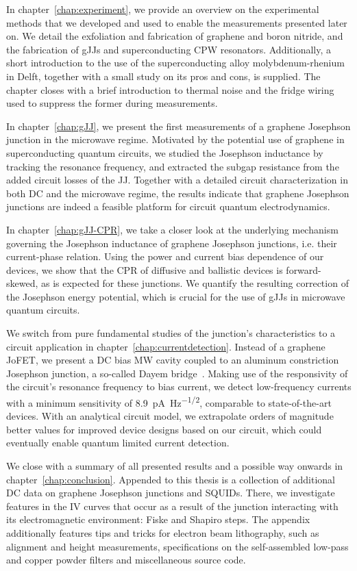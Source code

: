 In chapter~\ref{chap:experiment}, we provide an overview on the experimental methods that we developed and used to enable the measurements presented later on.
%
We detail the exfoliation and fabrication of graphene and boron nitride, and the fabrication of gJJs and superconducting CPW resonators.
%
Additionally, a short introduction to the use of the superconducting alloy molybdenum-rhenium in Delft, together with a small study on its pros and cons, is supplied.
%
The chapter closes with a brief introduction to thermal noise and the fridge wiring used to suppress the former during measurements.

In chapter~\ref{chap:gJJ}, we present the first measurements of a graphene Josephson junction in the microwave regime.
%
Motivated by the potential use of graphene in superconducting quantum circuits, we studied the Josephson inductance by tracking the resonance frequency, and extracted the subgap resistance from the added circuit losses of the JJ.
%
Together with a detailed circuit characterization in both DC and the microwave regime, the results indicate that graphene Josephson junctions are indeed a feasible platform for circuit quantum electrodynamics.


In chapter~\ref{chap:gJJ-CPR}, we take a closer look at the underlying mechanism governing the Josephson inductance of graphene Josephson junctions, i.e. their current-phase relation.
%
Using the power and current bias dependence of our devices, we show that the CPR of diffusive and ballistic devices is forward-skewed, as is expected for these junctions.
%
We quantify the resulting correction of the Josephson energy potential, which is crucial for the use of gJJs in microwave quantum circuits.

We switch from pure fundamental studies of the junction's characteristics to a circuit application in chapter~\ref{chap:currentdetection}.
%
Instead of a graphene JoFET, we present a DC bias MW cavity coupled to an aluminum constriction Josephson junction, a so-called Dayem bridge~\cite{andersonRadioFrequencyEffectsSuperconducting1964}.
%
Making use of the responsivity of the circuit's resonance frequency to bias current, we detect low-frequency currents with a minimum sensitivity of \SI{8.9}{\pico\ampere\per\hertz\tothe{1/2}}, comparable to state-of-the-art devices.
%
With an analytical circuit model, we extrapolate orders of magnitude better values for improved device designs based on our circuit, which could eventually enable quantum limited current detection.


We close with a summary of all presented results and a possible way onwards in chapter~\ref{chap:conclusion}.
%
Appended to this thesis is a collection of additional DC data on graphene Josephson junctions and SQUIDs.
%
There, we investigate features in the IV curves that occur as a result of the junction interacting with its electromagnetic environment: Fiske and Shapiro steps.
%
The appendix additionally features tips and tricks for electron beam lithography, such as alignment and height measurements, specifications on the self-assembled low-pass and copper powder filters and miscellaneous source code.



